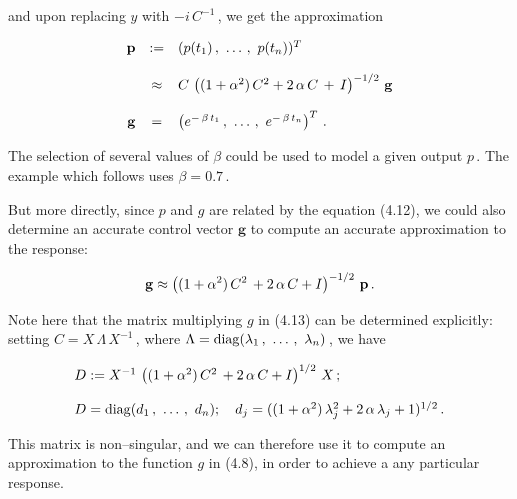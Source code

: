 \documentclass[11pt]{article}
\begin{document}
\begin{description}
\noindent and upon replacing $y$ with $-i\,C^{-1}$\,, we get the
approximation

\begin{equation}%
  \begin{array}{rcl}
      {\bf p} & := & (p(t_1)\,,\ \ldots\,,\ p(t_n))^T \\
   &&   \\
   & \approx &  C\,\left((1 + \alpha^2)\,C^2 +2 \, \alpha \,
      C \, + \, I\right)^{-1/2} \, {\bf g} \\
      && \\
      {\bf g} & = & \left(e^{-\,\beta\,t_1}\,,\ \ldots\,,\ e^{-\,\beta\,t_n}\right)^T\,.
  \end{array}
    \label{equation:4.13}
\end{equation}

\noindent The selection of several values of $\beta$ could be used to
model a given output $p$\,.  The example which follows uses $\beta =
0.7$\,.

\vspace{.1in} \noindent But more directly, since $p$ and $g$ are
related by the equation (4.12), we could also determine an accurate
control vector ${\mathbf g}$ to compute an accurate approximation to
the response:

\begin{equation}%
{\bf g} \approx \left((1 + \alpha^2)\,C^2\, + 2\,\alpha\,C +
I\right)^{-1/2} \, {\bf p}\,.
\label{equation:4.14}
\end{equation}

\noindent Note here that the matrix multiplying $g$ in (4.13) can be
determined explicitly: setting $C = X\,\Lambda\,X^{-1}$\,, where
$\Lambda = {\rm diag}(\lambda_1\,,\ \ldots\,,\ \lambda_n)$\,, we have 

\begin{equation}%
  \begin{array}{l}
D :=  X^{-1}\,\left((1 + \alpha^2)\,C^2\, + 2\,\alpha\,C
+I\right)^{1/2}\,X \,; \\
\\
D = {\rm diag}(d_1\,,\ \ldots\,,\ d_n); \ \ \ d_j = ((1 +
\alpha^2)\,\lambda_j^2 + 2\,\alpha\,\lambda_j + 1)^{1/2}\,.
\end{array}
\label{equation:4.15}
\end{equation}

\noindent This matrix is non--singular, and we can therefore use it to
compute an approximation to the function $g$ in (4.8), in order to 
achieve a any particular response.


\end{description}
\end{document}
